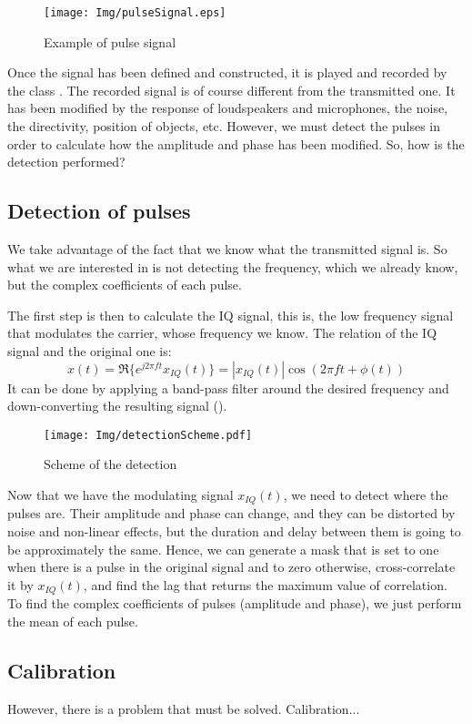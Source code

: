 \begin{figure}[h]
	\centering
	\texttt{[image: Img/pulseSignal.eps]}
	\caption[Pulse Signal]{Example of pulse signal}
	\label{examplePulseSignal}
\end{figure}

Once the signal has been defined and constructed, it is played and recorded by the class . The recorded signal is of course different from the transmitted one. It has been modified by the response of loudspeakers and microphones, the noise, the directivity, position of objects, etc. However, we must detect the pulses in order to calculate how the amplitude and phase has been modified. So, how is the detection performed?

\subsection{Detection of pulses}
We take advantage of the fact that we know what the transmitted signal is. So what we are interested in is not detecting the frequency, which we already know, but the complex coefficients of each pulse.

The first step is then to calculate the IQ signal, this is, the low frequency signal that modulates the carrier, whose frequency we know. The relation of the IQ signal and the original one is:
\begin{equation}
x(t) = \Re\{ e^{j 2 \pi f t} x_{IQ}(t) \} = |x_{IQ}(t)| \cos(2 \pi f t + \phi(t))
\label{IQcondition}
\end{equation}
It can be done by applying a band-pass filter around the desired frequency and down-converting the resulting signal ().
\begin{figure}[h]
	\centering
	\texttt{[image: Img/detectionScheme.pdf]}
	\caption[Detection Scheme]{Scheme of the detection}
	\label{detectionScheme}
\end{figure}

Now that we have the modulating signal $x_{IQ}(t)$, we need to detect where the pulses are. Their amplitude and phase can change, and they can be distorted by noise and non-linear effects, but the duration and delay between them is going to be approximately the same. Hence, we can generate a mask that is set to one when there is a pulse in the original signal and to zero otherwise, cross-correlate it by $x_{IQ}(t)$, and find the lag that returns the maximum value of correlation. To find the complex coefficients of pulses (amplitude and phase), we just perform the mean of each pulse.

\subsection{Calibration}
However, there is a problem that must be solved. Calibration...
